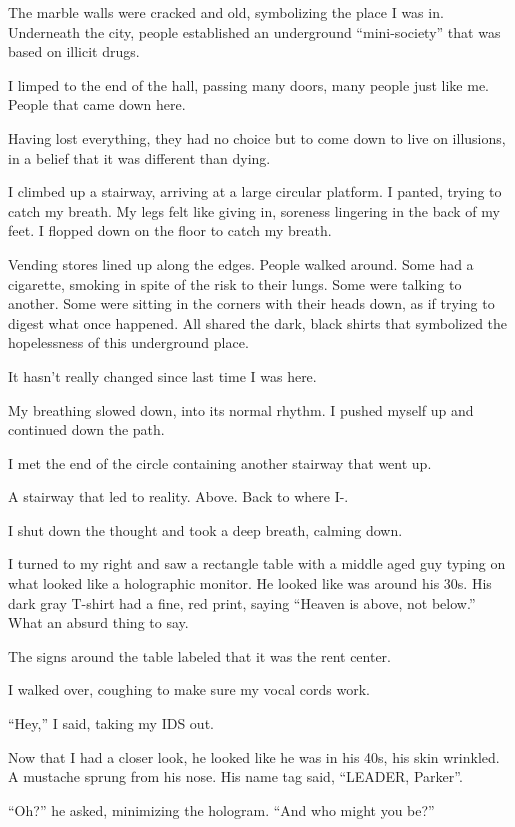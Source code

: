 The marble walls were cracked and old, symbolizing the place I was in. Underneath the city, people established an underground “mini-society” that was based on illicit drugs. 

I limped to the end of the hall, passing many doors, many people just like me. People that came down here.

Having lost everything, they had no choice but to come down to live on illusions, in a belief that it was different than dying.

I climbed up a stairway, arriving at a large circular platform. I panted, trying to catch my breath. My legs felt like giving in, soreness lingering in the back of my feet. I flopped down on the floor to catch my breath.

Vending stores lined up along the edges. People walked around. Some had a cigarette, smoking in spite of the risk to their lungs. Some were talking to another. Some were sitting in the corners with their heads down, as if trying to digest what once happened. All shared the dark, black shirts that symbolized the hopelessness of this underground place.

 It hasn't really changed since last time I was here.

My breathing slowed down, into its normal rhythm. I pushed myself up and continued down the path.

I met the end of the circle containing another stairway that went up. 

A stairway that led to reality. Above. Back to where I-.

I shut down the thought and took a deep breath, calming down.

I turned to my right and saw a rectangle table with a middle aged guy typing on what looked like a holographic monitor. He looked like was around his 30s. His dark gray T-shirt had a fine, red print, saying “Heaven is above, not below.” What an absurd thing to say. 

The signs around the table labeled that it was the rent center.

I walked over, coughing to make sure my vocal cords work.

“Hey,” I said, taking my IDS out.

Now that I had a closer look, he looked like he was in his 40s, his skin wrinkled. A mustache sprung from his nose. His name tag said, “LEADER, Parker”.

“Oh?” he asked, minimizing the hologram. “And who might you be?”

